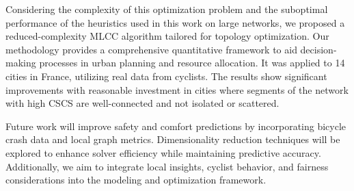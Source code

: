 \documentclass[lettersize,journal]{IEEEtran}
\begin{document}
Considering the complexity of this optimization problem and the suboptimal performance of the heuristics used in this work on large networks, we proposed a reduced-complexity MLCC algorithm tailored for topology optimization. Our methodology provides a comprehensive quantitative framework to aid decision-making processes in urban planning and resource allocation. It was applied to 14 cities in France, utilizing real data from cyclists. The results show significant improvements with reasonable investment in cities where segments of the network with high CSCS are well-connected and not isolated or scattered.





Future work will improve safety and comfort predictions by incorporating bicycle crash data and local graph metrics. Dimensionality reduction techniques will be explored to enhance solver efficiency while maintaining predictive accuracy. Additionally, we aim to integrate local insights, cyclist behavior, and fairness considerations into the modeling and optimization framework.  
\end{document}
